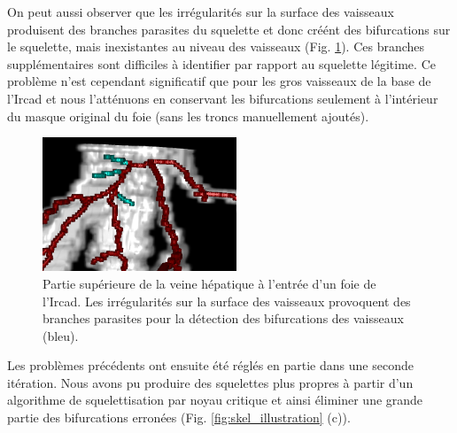 On peut aussi observer que les irrégularités sur la surface des vaisseaux produisent des branches parasites du squelette et donc créént des bifurcations sur le squelette, mais inexistantes au niveau des vaisseaux (Fig. \ref{fig:barbelures}). Ces branches supplémentaires sont difficiles à identifier par rapport au squelette légitime. Ce problème n'est cependant significatif que pour les gros vaisseaux de la base de l'Ircad et nous l'atténuons en conservant les bifurcations seulement à l'intérieur du masque original du foie (sans les troncs manuellement ajoutés).
\begin{figure}[!ht]
  \centering
  \includegraphics[height=4cm]{Images/barbelures.png}
  \caption{Partie supérieure de la veine hépatique à l'entrée d'un foie de l'Ircad. Les irrégularités sur la surface des vaisseaux provoquent des branches parasites pour la détection des bifurcations des vaisseaux (bleu).}
  \label{fig:barbelures}
\end{figure}
Les problèmes précédents ont ensuite été réglés en partie dans une seconde itération. Nous avons pu produire des squelettes plus propres à partir d'un algorithme de squelettisation par noyau critique \cite{Bertrand2006_critical_kernel} et ainsi éliminer une grande partie des bifurcations erronées (Fig. \ref{fig:skel_illustration} (c)).

